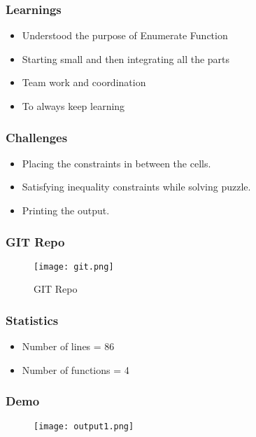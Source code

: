 \documentclass[14pt]{beamer}
\begin{document}
 \begin{frame}
  \frametitle{Learnings}
  \begin{itemize}
      \item Understood the purpose of Enumerate Function
      \item Starting small and then integrating all the parts
      \item Team work and coordination
      \item To always keep learning 
   \end{itemize}
\end{frame}
\begin{frame}
  \frametitle{Challenges}
    \begin{itemize}
        \item Placing the constraints in between the cells.
        \item Satisfying inequality constraints while solving puzzle.
        \item Printing the output.
    \end{itemize}
\end{frame}
\begin{frame}
	\frametitle{GIT Repo}
	 \begin{figure}
       	\texttt{[image: git.png]}
	\caption{GIT Repo}
   \end{figure}
    \end{frame}
\begin{frame}
  \frametitle{Statistics}
  \begin{itemize}
      \item Number of lines = 86
      \item Number of functions = 4
   \end{itemize}
\end{frame}
\begin{frame}
	\frametitle{Demo}
	 \begin{figure}
       	\texttt{[image: output1.png]}
   \end{figure}
    \end{frame}

 
\end{document}
